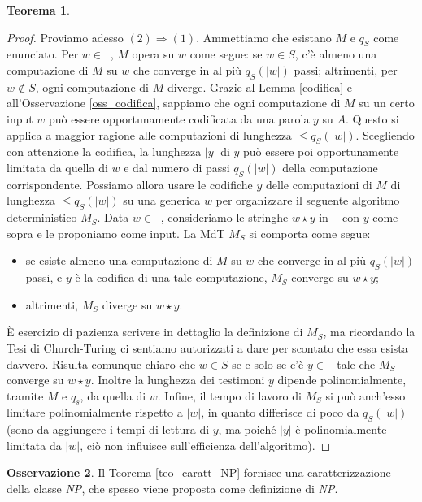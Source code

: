 \documentclass[12pt,a4paper]{report}
\theoremstyle{definition}
\newtheorem{teo}{Teorema}[section]  %
\newtheorem{oss}[teo]{Osservazione}  %
\DeclareMathOperator{\aaa}{\textit{A}^{\star}}
\begin{document}
\begin{teo}
\begin{proof}
Proviamo adesso $(2) \Longrightarrow (1)$. Ammettiamo che esistano $M$ e $q_S$ come enunciato. Per $w \in \aaa$, $M$ opera su $w$ come segue: se $w \in S$, c'è almeno una computazione di $M$ su $w$ che converge in al più $q_S(|w|)$ passi; altrimenti, per $w \not\in S$, ogni computazione di $M$ diverge. Grazie al Lemma \ref{codifica} e all'Osservazione \ref{oss_codifica}, sappiamo che ogni computazione di $M$ su un certo input $w$ può essere opportunamente codificata da una parola $y$ su $A$. Questo si applica a maggior ragione alle computazioni di lunghezza $\leq q_S(|w|)$. Scegliendo con attenzione la codifica, la lunghezza $|y|$ di $y$ può essere poi opportunamente limitata da quella di $w$ e dal numero di passi $q_S(|w|)$ della computazione corrispondente. Possiamo allora usare le codifiche $y$ delle computazioni di $M$ di lunghezza $\leq q_S(|w|)$ su una generica $w$ per organizzare il seguente algoritmo deterministico $M_S$. Data $w \in \aaa$, consideriamo le stringhe $w \star y$ in $\aaa$ con $y$ come sopra e le proponiamo come input. La MdT $M_S$ si comporta come segue:
\begin{itemize}
\item se esiste almeno una computazione di $M$ su $w$ che converge in al più $q_S(|w|)$ passi, e $y$ è la codifica di una tale computazione, $M_S$ converge su $w \star y$;
\item altrimenti, $M_S$ diverge su $w \star y$.
\end{itemize}
È esercizio di pazienza scrivere in dettaglio la definizione di $M_S$, ma ricordando la Tesi di Church-Turing ci sentiamo autorizzati a dare per scontato che essa esista davvero. Risulta comunque chiaro che $w \in S$ se e solo se c'è $y \in \aaa$ tale che $M_S$ converge su $w \star y$. Inoltre la lunghezza dei testimoni $y$ dipende polinomialmente, tramite $M$ e $q_s$, da quella di $w$. Infine, il tempo di lavoro di $M_S$ si può anch'esso limitare polinomialmente rispetto a $|w|$, in quanto differisce di poco da $q_S(|w|)$ (sono da aggiungere i tempi di lettura di $y$, ma poiché $|y|$ è polinomialmente limitata da $|w|$, ciò non influisce sull'efficienza dell'algoritmo).
\end{proof}
\end{teo}

\begin{oss}
Il Teorema \ref{teo_caratt_NP} fornisce una caratterizzazione della classe \emph{NP}, che spesso viene proposta come definizione di \emph{NP}.
\end{oss}
\end{document}
